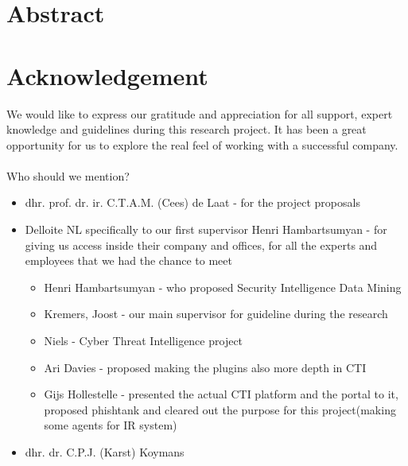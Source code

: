 \documentclass[12pt]{article}
\begin{document}
\section*{Abstract}
\newpage
\section*{Acknowledgement}

We would like to express our gratitude and appreciation for all support, expert knowledge and guidelines during this research project. It has been a great opportunity for us to explore the real feel of working with a successful company. 
\\
\\
Who should we mention? 
\begin{itemize}
\item{dhr. prof. dr. ir. C.T.A.M. (Cees) de Laat - for the project proposals}
\item{Delloite NL specifically to our first supervisor Henri Hambartsumyan - for giving us access inside their company and offices, for all the experts and employees that we had the chance to meet}
 \begin{itemize}
 \item{Henri Hambartsumyan - who proposed Security Intelligence Data Mining}
 \item{Kremers, Joost  - our main supervisor for guideline during the research }
 \item{Niels - Cyber Threat Intelligence project}
 \item{Ari Davies - proposed making the plugins also more depth in CTI }
 \item{Gijs Hollestelle - presented the actual CTI platform and the portal to it, proposed phishtank and cleared out the purpose for this project(making some agents for IR system) }
 \end{itemize}
\item{dhr. dr. C.P.J. (Karst) Koymans}
\end{itemize}


 
\newpage

\tableofcontents
\newpage
\end{document}
